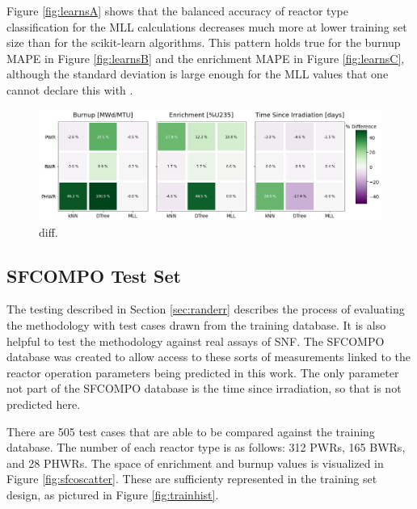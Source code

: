 Figure \ref{fig:learnsA} shows that the balanced accuracy of reactor type
classification for the \gls{MLL} calculations decreases much more at lower
training set size than for the scikit-learn algorithms.  This pattern holds
true for the burnup \gls{MAPE} in Figure \ref{fig:learnsB} and the enrichment
\gls{MAPE} in Figure \ref{fig:learnsC}, although the standard deviation is
large enough for the \gls{MLL} values that one cannot declare this with .

\begin{figure}[!ht]
  \centering
  \includegraphics[width=1.1\textwidth]{./chapters/exp1/rxtr-type_known-unknown_diff.png}
  \caption{diff.}
  \label{fig:knownrxtr}
\end{figure}

\subsection{SFCOMPO Test Set}
\label{sec:sfcompo}

The testing described in Section \ref{sec:randerr} describes the process of
evaluating the methodology with test cases drawn from the training database.
It is also helpful to test the methodology against real assays of \gls{SNF}.
The \gls{SFCOMPO} database was created to allow access to these sorts of
measurements linked to the reactor operation parameters being predicted in this
work. The only parameter not part of the \gls{SFCOMPO} database is the time
since irradiation, so that is not predicted here. 

There are 505 test cases that are able to be compared against the training
database.  The number of each reactor type is as follows: 312 \gls{PWR}s, 165
\gls{BWR}s, and 28 \gls{PHWR}s. The space of enrichment and burnup values is
visualized in Figure \ref{fig:sfcoscatter}. These are sufficienty represented
in the training set design, as pictured in Figure \ref{fig:trainhist}.

